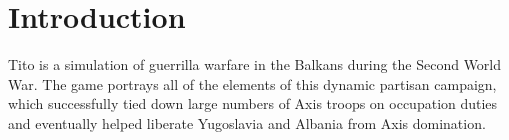 \section{Introduction}\label{sec:1.0}

Tito is a simulation of guerrilla warfare in the Balkans during the Second World War. The game portrays all of the elements of this dynamic partisan campaign, which successfully tied down large numbers of Axis troops on occupation duties and eventually helped liberate Yugoslavia and Albania from Axis domination.
